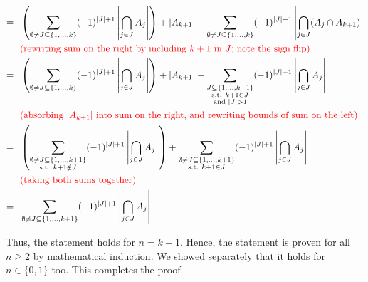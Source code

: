\begin{solution}
\begin{align*}
		=~~ & \left(\sum_{\emptyset\neq J\subseteq\{1,\dots,k\}}(-1)^{|J|+1}\left|\bigcap_{j\in J}A_j\right|\right) + |A_{k+1}| - \sum_{\emptyset\neq J\subseteq\{1,\dots,k\}}(-1)^{|J|+1}\left|\bigcap_{j\in J}(A_j\cap A_{k+1})\right| \\
		    & \text{\red{(rewriting sum on the right by including $k+1$ in $J$; note the sign flip)}}                                                                                                                                    \\
		=~~ & \left(\sum_{\emptyset\neq J\subseteq\{1,\dots,k\}}(-1)^{|J|+1}\left|\bigcap_{j\in J}A_j\right|\right) + |A_{k+1}| + \sum_{\substack{J\subseteq\{1,\dots,k+1\}                                                              \\\text{s.t. }k+1\in J\\\text{and }|J|>1}}(-1)^{|J|+1}\left|\bigcap_{j\in J}A_j\right| \\
		    & \text{\red{(absorbing $|A_{k+1}|$ into sum on the right, and rewriting bounds of sum on the left)}}                                                                                                                        \\
		=~~ & \left(\sum_{\substack{\emptyset\neq J\subseteq\{1,\dots,k+1\}                                                                                                                                                              \\\text{s.t. }k+1\notin J}}(-1)^{|J|+1}\left|\bigcap_{j\in J}A_j\right|\right) + \sum_{\substack{\emptyset\neq J\subseteq\{1,\dots,k+1\}                                                                       \\\text{s.t. }k+1\in J}}(-1)^{|J|+1}\left|\bigcap_{j\in J}A_j\right| \\
		    & \text{\red{(taking both sums together)}}                                                                                                                                                                                   \\
		=~~ & \sum_{\emptyset\neq J\subseteq\{1,\dots,k+1\}                                                                       }(-1)^{|J|+1}\left|\bigcap_{j\in J}A_j\right|                                                          \\
	\end{align*}
	\endgroup

	Thus, the statement holds for $n=k+1$. Hence, the statement is proven for all $n\geq2$ by mathematical induction. We showed separately that it holds for $n\in\{0,1\}$ too. This completes the proof.
\end{solution}

